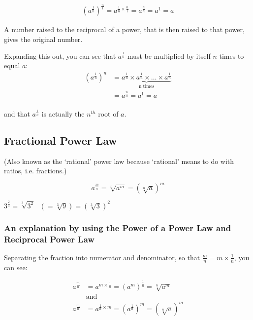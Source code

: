 \documentclass{article}
\begin{document}
\begin{large}
\begin{align*}
(a^{\frac{1}{n}})^{\frac{n}{1}}=a^{\frac{1}{n} \times \frac{n}{1}}=a^{\frac{n}{n}}=a^1=a
\end{align*}
\end{large}

A number raised to the reciprocal of a power, that is then raised to that power, gives the original number.

\newpage

Expanding this out, you can see that $a^{\frac{1}{n}}$ must be multiplied by itself $n$ times to equal $a$:\\
\begin{equation*}
\begin{split}
(a^{\frac{1}{n}})^n&= \underbrace{a^{\frac{1}{n}} \times a^{\frac{1}{n}} \times \ldots \times a^{\frac{1}{n}}}_{\text{n times}}\\
&=a^{\frac{n}{n}}=a^1=a\\
\end{split}
\end{equation*}

and that $a^{\frac{1}{n}}$ is actually the $n^{th}$ root of $a$.

\newpage
\subsection{Fractional Power Law}
(Also known as the ‘rational’ power law because ‘rational’ means to do with ratios, i.e. fractions.)

\begin{Large}
$$a^{\frac{m}{n}}=\sqrt[n]{a^m}=(\sqrt[n]{a})^m$$
\end{Large}

\vspace{16pt}
\begin{center}
$3^{\frac{2}{3}}=\sqrt[3]{3^2}\text{  }(=\sqrt[3]{9} ) =(\sqrt[3]{3})^2$
\end{center}

\vspace{16pt}
\subsubsection*{An explanation by using the Power of a Power Law and Reciprocal Power Law}
Separating the fraction into numerator and denominator, so that $\frac{m}{n}=m \times \frac{1}{n}$, you can see:

\begin{large}
\begin{align*}
a^{\frac{m}{n}}&=a^{m \times \frac{1}{n}}=(a^m)^{\frac{1}{n}}=\sqrt[n]{a^m}\\
               &\text{and }\\
a^{\frac{m}{n}}&=a^{\frac{1}{n} \times m}=(a^{\frac{1}{n}})^m=(\sqrt[n]{a})^m\\
\end{align*}
\end{large}
\end{document}
